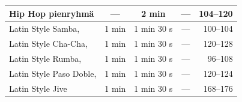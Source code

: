 \documentclass[12pt, a4paper, oneside]{article}
\begin{document}
\begin{table}[ht]
\begin{tabular}{@{\hspace{0.25cm}}lcccr@{\hspace{0.25cm}}}
        Hip Hop pienryhmä                               & ---                 & 2 min                  & ---                    & 104--120       \\ \midrule
        Latin Style Samba,                              & 1 min               & 1 min 30 s             & ---                    & 100--104       \\
        Latin Style Cha-Cha,                            & 1 min               & 1 min 30 s             & ---                    & 120--128       \\
        Latin Style Rumba,                              & 1 min               & 1 min 30 s             & ---                    &  96--108       \\
        Latin Style Paso Doble,                         & 1 min               & 1 min 30 s             & ---                    & 120--124       \\
        Latin Style Jive                                & 1 min               & 1 min 30 s             & ---                    & 168--176       \\ \bottomrule
    \end{tabular}
    \label{tab:bpm-rajat}
\end{table}

\end{document}
